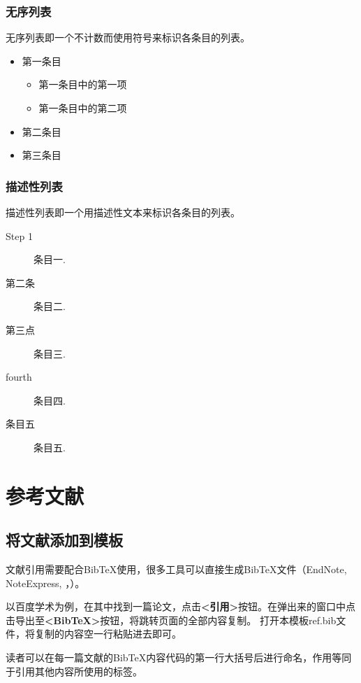 \subsubsection{无序列表}
  无序列表即一个不计数而使用符号来标识各条目的列表。
  \begin{itemize}
      \item 第一条目
      \begin{itemize}
          \item 第一条目中的第一项
          \item 第一条目中的第二项
      \end{itemize}
      \item 第二条目
      \item 第三条目
  \end{itemize}

\subsubsection{描述性列表}

描述性列表即一个用描述性文本来标识各条目的列表。

\begin{description}
  \item[Step 1]  条目一.
  \item[第二条]  条目二.
  \item[第三点]  条目三.
  \item[fourth]  条目四.
  \item[条目五]  条目五.
\end{description}

\section{参考文献}

\subsection{将文献添加到模板}

文献引用需要配合BibTeX使用，很多工具可以直接生成BibTeX文件（EndNote, NoteExpress, ，）。\par 以百度学术为例，在其中找到一篇论文，点击\textbf{<引用>}按钮。在弹出来的窗口中点击导出至\textbf{<BibTeX>}按钮，将跳转页面的全部内容复制。 打开本模板ref.bib文件，将复制的内容空一行粘贴进去即可。

读者可以在每一篇文献的BibTeX内容代码的第一行大括号后进行命名，作用等同于引用其他内容所使用的标签。

